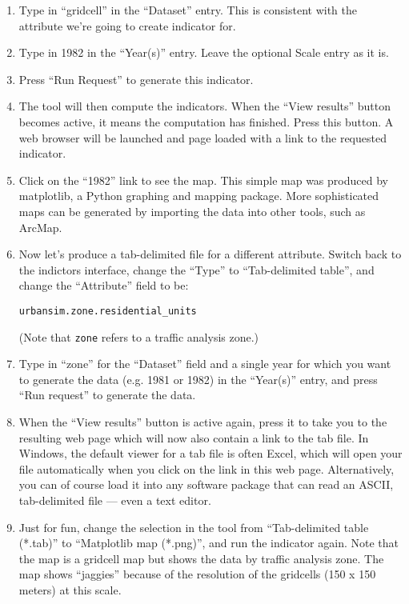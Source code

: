 \documentclass{howto}
\begin{document}
\begin{enumerate}
\item Type in ``gridcell'' in the ``Dataset'' entry.  This is consistent with the attribute 
we're going to create indicator for. 

\item Type in 1982 in the ``Year(s)'' entry. Leave the optional Scale entry as it is.

\item Press ``Run Request'' to generate this indicator.

\item The tool will then compute the indicators. When the
``View results'' button becomes active, it means the computation has finished.
Press this button. A web
browser will be launched and page loaded with a link to the requested indicator.

\item Click on the ``1982'' link to see the map. This simple map was
produced by matplotlib, a Python graphing and mapping package.  More
sophisticated maps can be generated by importing the data into other
tools, such as ArcMap.

\item Now let's produce a tab-delimited file for a different
attribute. Switch back to the indictors interface, change the ``Type'' 
to ``Tab-delimited table'', and change the
``Attribute'' field to be:

\begin{verbatim}
urbansim.zone.residential_units
\end{verbatim}

(Note that \verb|zone| refers to a traffic analysis zone.)

\item Type in ``zone'' for the ``Dataset'' field and a single year for 
which you want to generate the data (e.g. 1981 or 1982) in the ``Year(s)'' 
entry,  and press ``Run request'' to generate the data.

\item When the ``View results'' button is active again, press it to
take you to the resulting web page which will now also contain a link
to the tab file.  In Windows, the default viewer for a tab file is
often Excel, which will open your file automatically when you click on
the link in this web page. Alternatively, you can of course load it
into any software package that can read an ASCII, tab-delimited file
--- even a text editor.

\item Just for fun, change the selection in the tool from
``Tab-delimited table (*.tab)'' to ``Matplotlib map (*.png)'', and
run the indicator again.  Note that the map is a gridcell map but
shows the data by traffic analysis zone.  The map shows ``jaggies''
because of the resolution of the gridcells (150 x 150 meters) at
this scale.


\end{enumerate}
\end{document}
